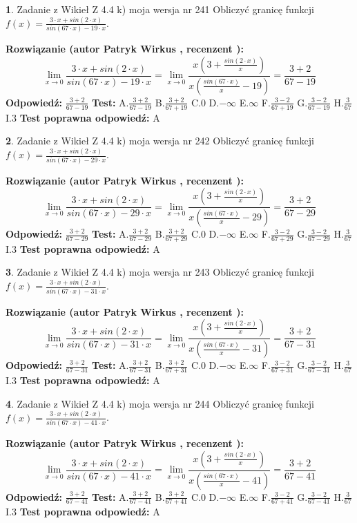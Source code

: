 \documentclass[12pt, a4paper]{article}
\theoremstyle{definition} %
\newtheorem{zad}{}
\newcommand{\zadStart}[1]{\begin{zad}#1\newline}
\newcommand{\zadStop}{\end{zad}}
\newcommand{\rozwStart}[2]{\noindent \textbf{Rozwiązanie (autor #1 , recenzent #2): }\newline}
\newcommand{\rozwStop}{\newline}
\newcommand{\odpStart}{\noindent \textbf{Odpowiedź:}\newline}
\newcommand{\odpStop}{\newline}
\newcommand{\testStart}{\noindent \textbf{Test:}\newline}
\newcommand{\testStop}{\newline}
\newcommand{\kluczStart}{\noindent \textbf{Test poprawna odpowiedź:}\newline}
\newcommand{\kluczStop}{\newline}
\begin{document}
\zadStart{Zadanie z Wikieł Z 4.4 k) moja wersja nr 241}
Obliczyć granicę funkcji $f(x)=\frac{3\cdot x +sin(2\cdot x)}{sin(67\cdot x) -19\cdot x}$.
\zadStop
\rozwStart{Patryk Wirkus}{}
$$\lim\limits_{x\to 0}\frac{3\cdot x +sin(2\cdot x)}{sin(67\cdot x) -19\cdot x}
=\lim\limits_{x\to 0}\frac{x(3+\frac{sin(2\cdot x)}{x})}{x(\frac{sin(67\cdot x)}{x}-19)}
=\frac{3+2}{67-19}$$
\rozwStop
\odpStart
$\frac{3+2}{67-19}$
\odpStop
\testStart
A.$\frac{3+2}{67-19}$
B.$\frac{3+2}{67+19}$
C.$0$
D.$-\infty$
E.$\infty$
F.$\frac{3-2}{67+19}$
G.$\frac{3-2}{67-19}$
H.$\frac{3}{67}$
I.$3$
\testStop
\kluczStart
A
\kluczStop



\zadStart{Zadanie z Wikieł Z 4.4 k) moja wersja nr 242}
Obliczyć granicę funkcji $f(x)=\frac{3\cdot x +sin(2\cdot x)}{sin(67\cdot x) -29\cdot x}$.
\zadStop
\rozwStart{Patryk Wirkus}{}
$$\lim\limits_{x\to 0}\frac{3\cdot x +sin(2\cdot x)}{sin(67\cdot x) -29\cdot x}
=\lim\limits_{x\to 0}\frac{x(3+\frac{sin(2\cdot x)}{x})}{x(\frac{sin(67\cdot x)}{x}-29)}
=\frac{3+2}{67-29}$$
\rozwStop
\odpStart
$\frac{3+2}{67-29}$
\odpStop
\testStart
A.$\frac{3+2}{67-29}$
B.$\frac{3+2}{67+29}$
C.$0$
D.$-\infty$
E.$\infty$
F.$\frac{3-2}{67+29}$
G.$\frac{3-2}{67-29}$
H.$\frac{3}{67}$
I.$3$
\testStop
\kluczStart
A
\kluczStop



\zadStart{Zadanie z Wikieł Z 4.4 k) moja wersja nr 243}
Obliczyć granicę funkcji $f(x)=\frac{3\cdot x +sin(2\cdot x)}{sin(67\cdot x) -31\cdot x}$.
\zadStop
\rozwStart{Patryk Wirkus}{}
$$\lim\limits_{x\to 0}\frac{3\cdot x +sin(2\cdot x)}{sin(67\cdot x) -31\cdot x}
=\lim\limits_{x\to 0}\frac{x(3+\frac{sin(2\cdot x)}{x})}{x(\frac{sin(67\cdot x)}{x}-31)}
=\frac{3+2}{67-31}$$
\rozwStop
\odpStart
$\frac{3+2}{67-31}$
\odpStop
\testStart
A.$\frac{3+2}{67-31}$
B.$\frac{3+2}{67+31}$
C.$0$
D.$-\infty$
E.$\infty$
F.$\frac{3-2}{67+31}$
G.$\frac{3-2}{67-31}$
H.$\frac{3}{67}$
I.$3$
\testStop
\kluczStart
A
\kluczStop



\zadStart{Zadanie z Wikieł Z 4.4 k) moja wersja nr 244}
Obliczyć granicę funkcji $f(x)=\frac{3\cdot x +sin(2\cdot x)}{sin(67\cdot x) -41\cdot x}$.
\zadStop
\rozwStart{Patryk Wirkus}{}
$$\lim\limits_{x\to 0}\frac{3\cdot x +sin(2\cdot x)}{sin(67\cdot x) -41\cdot x}
=\lim\limits_{x\to 0}\frac{x(3+\frac{sin(2\cdot x)}{x})}{x(\frac{sin(67\cdot x)}{x}-41)}
=\frac{3+2}{67-41}$$
\rozwStop
\odpStart
$\frac{3+2}{67-41}$
\odpStop
\testStart
A.$\frac{3+2}{67-41}$
B.$\frac{3+2}{67+41}$
C.$0$
D.$-\infty$
E.$\infty$
F.$\frac{3-2}{67+41}$
G.$\frac{3-2}{67-41}$
H.$\frac{3}{67}$
I.$3$
\testStop
\kluczStart
A
\kluczStop
\end{document}
